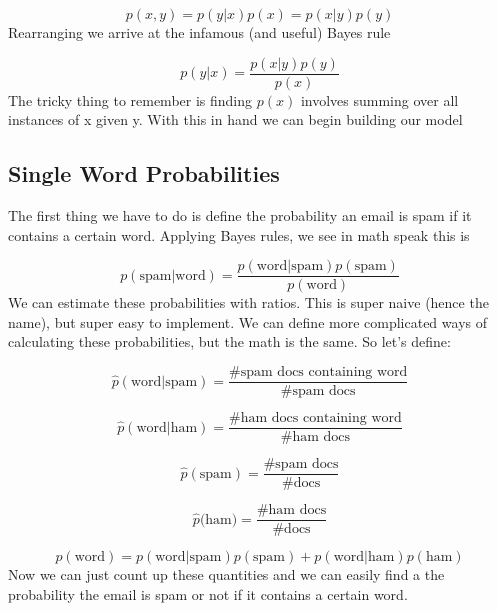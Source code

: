 \begin{equation}
   p(x, y) = p(y|x)p(x)  = p(x|y)p(y)
\end{equation}
Rearranging we arrive at the infamous (and useful) Bayes rule

\begin{equation}
    p(y|x) = \frac{p(x|y)p(y)}{p(x)}
\end{equation}
The tricky thing to remember is finding $p(x)$ involves summing over all instances of x given y. With this in hand we can begin building our model

\subsection{Single Word Probabilities}
The first thing we have to do is define the probability an email is spam if it contains a certain word. Applying Bayes rules, we see in math speak this is

\begin{equation}
    p(\text{spam} | \text{word}) = \frac{p(\text{word}|\text{spam})p(\text{spam})}{p(\text{word})}
\end{equation}
We can estimate these probabilities with ratios. This is super naive (hence the name), but super easy to implement. We can define more complicated ways of calculating these probabilities, but the math is the same. So let's define:

\begin{equation}
\hat{p}(\text{word}|\text{spam}) = \frac{\text{\# spam docs containing word}}{\text{\# spam docs}}
\end{equation}

\begin{equation}
\hat{p}(\text{word}|\text{ham}) = \frac{\text{\# ham docs containing word}}{\text{\# ham docs}}
\end{equation}

\begin{equation}
\hat{p}(\text{spam}) = \frac{\text{\# spam docs}}{\text{\# docs}}
\end{equation}

\begin{equation}
\hat{p}(\text{ham)} = \frac{\text{\# ham docs}}{\text{\# docs}}
\end{equation}

\begin{equation}
p(\text{word}) = p(\text{word}|\text{spam})p(\text{spam}) + p(\text{word}|\text{ham})p(\text{ham})
\end{equation}
Now we can just count up these quantities and we can easily find a the probability the email is spam or not if it contains a certain word. 

